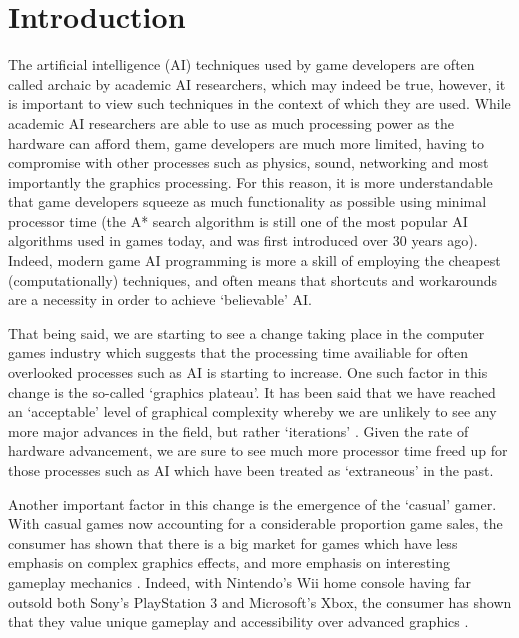 \documentclass[a4paper,oneside]{report}
\begin{document}
%
%

\chapter{Introduction}

The artificial intelligence (AI) techniques used by game developers are often called archaic by academic AI researchers, which may indeed be true, however, it is important to view such techniques in the context of which they are used. While academic AI researchers are able to use as much processing power as the hardware can afford them, game developers are much more limited, having to compromise with other processes such as physics, sound, networking and most importantly the graphics processing. For this reason, it is more understandable that game developers squeeze as much functionality as possible using minimal processor time (the A* search algorithm is still one of the most popular AI algorithms used in games today, and was first introduced over 30 years ago). Indeed, modern game AI programming is more a skill of employing the cheapest (computationally) techniques, and often means that shortcuts and workarounds are a necessity in order to achieve `believable' AI. 

That being said, we are starting to see a change taking place in the computer games industry which suggests that the processing time availiable for often overlooked processes such as AI is starting to increase. One such factor in this change is the so-called `graphics plateau'. It has been said that we have reached an `acceptable' level of graphical complexity whereby we are unlikely to see any more major advances in the field, but rather `iterations' \cite{Sheffield:2008fk}. Given the rate of hardware advancement, we are sure to see much more processor time freed up for those processes such as AI which have been treated as `extraneous' in the past. 

Another important factor in this change is the emergence of the `casual' gamer. With casual games now accounting for a considerable proportion game sales, the consumer has shown that there is a big market for games which have less emphasis on complex graphics effects, and more emphasis on interesting gameplay mechanics \cite{Association:2011uq}. Indeed, with Nintendo's Wii home console having far outsold both Sony's PlayStation 3 and Microsoft's Xbox, the consumer has shown that they value unique gameplay and accessibility over advanced graphics \cite{:2012dq, Nintendo:2012nx, :cr}. 
\end{document}
